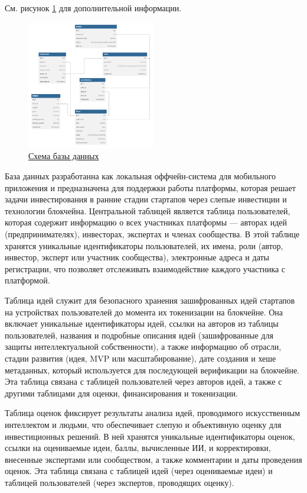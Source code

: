 \documentclass[
    candidate, %
    subf, %
    dotsinheaders=false,
]{disser}
\begin{document}
См. рисунок \ref{fig:database} для дополнительной информации.

\begin{figure}[h]
  \centering
  \includegraphics[width=0.5\textwidth]{./assets/database.png}
  \caption{{\protect\hyperlink{figref:database}{Схема базы данных}}}
  \label{fig:database}
\end{figure}

База данных разработанна как локальная оффчейн-система для мобильного приложения и предназначена для поддержки работы платформы, которая решает задачи инвестирования в ранние стадии стартапов через слепые инвестиции и технологии блокчейна. Центральной таблицей является таблица пользователей, которая содержит информацию о всех участниках платформы — авторах идей (предпринимателях), инвесторах, экспертах и членах сообщества. В этой таблице хранятся уникальные идентификаторы пользователей, их имена, роли (автор, инвестор, эксперт или участник сообщества), электронные адреса и даты регистрации, что позволяет отслеживать взаимодействие каждого участника с платформой.

Таблица идей служит для безопасного хранения зашифрованных идей стартапов на устройствах пользователей до момента их токенизации на блокчейне. Она включает уникальные идентификаторы идей, ссылки на авторов из таблицы пользователей, названия и подробные описания идей (зашифрованные для защиты интеллектуальной собственности), а также информацию об отрасли, стадии развития (идея, MVP или масштабирование), дате создания и хеше метаданных, который используется для последующей верификации на блокчейне. Эта таблица связана с таблицей пользователей через авторов идей, а также с другими таблицами для оценки, финансирования и токенизации.

Таблица оценок фиксирует результаты анализа идей, проводимого искусственным интеллектом и людьми, что обеспечивает слепую и объективную оценку для инвестиционных решений. В ней хранятся уникальные идентификаторы оценок, ссылки на оцениваемые идеи, баллы, вычисленные ИИ, и корректировки, внесенные экспертами или сообществом, а также комментарии и даты проведения оценок. Эта таблица связана с таблицей идей (через оцениваемые идеи) и таблицей пользователей (через экспертов, проводящих оценку).
\end{document}
